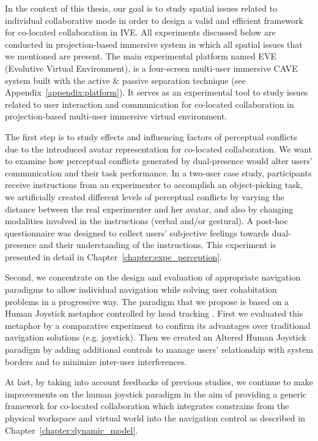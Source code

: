 In the context of this thesis, our goal is to study spatial issues related to individual collaborative mode in order to design a valid and efficient framework for co-located collaboration in IVE. All experiments discussed below are conducted in projection-based immersive system in which all spatial issues that we mentioned are present. The main experimental platform named EVE (Evolutive Virtual Environment), is a four-screen multi-user immersive CAVE system built with the active \& passive separation technique (see Appendix~\ref{appendix:platform}). It serves as an experimental tool to study issues related to user interaction and communication for co-located collaboration in projection-based multi-user immersive virtual environment.

The first step is to study effects and influencing factors of perceptual conflicts due to the introduced avatar representation for co-located collaboration. We want to examine how perceptual conflicts generated by dual-presence would alter users' communication and their task performance. In a two-user case study, participants receive instructions from an experimenter to accomplish an object-picking task, we artificially created different levels of perceptual conflicts by varying the distance between the real experimenter and her avatar, and also by changing modalities involved in the instructions (verbal and/or gestural). A post-hoc questionnaire was designed to collect users' subjective feelings towards dual-presence and their understanding of the instructions. This experiment is presented in detail in Chapter~\ref{chapter:expe_perception}.

Second, we concentrate on the design and evaluation of appropriate navigation paradigms to allow individual navigation while solving user cohabitation problems in a progressive way. The paradigm that we propose is based on a Human Joystick metaphor controlled by head tracking \citep{Bourdot2002HCNav}. First we evaluated this metaphor by a comparative experiment \citep{Chen2013NVW} to confirm its advantages over traditional navigation solutions (e.g. joystick). Then we created an Altered Human Joystick paradigm by adding additional controls to manage users' relationship with system borders and to minimize inter-user interferences.

At last, by taking into account feedbacks of previous studies, we continue to make improvements on the human joystick paradigm in the aim of providing a generic framework for co-located collaboration which integrates constrains from the physical workspace and virtual world into the navigation control as described in Chapter~\ref{chapter:dynamic_model}.

